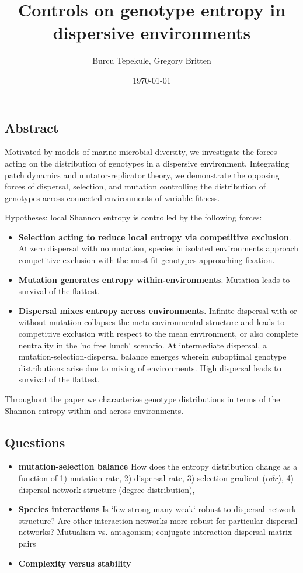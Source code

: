 \documentclass[12pt]{article}
\title{Controls on genotype entropy in dispersive environments}
\author{\small{Burcu Tepekule, Gregory Britten}}
\date{\small{\printdayoff\today}}
\begin{document}
\maketitle 

\subsection*{Abstract}
Motivated by models of marine microbial diversity, we investigate the forces acting on the distribution of genotypes in a dispersive environment. Integrating patch dynamics and mutator-replicator theory, we demonstrate the opposing forces of dispersal, selection, and mutation controlling the distribution of genotypes across connected environments of variable fitness. 

Hypotheses: local Shannon entropy is controlled by the following forces:
\begin{itemize}
\item \textbf{Selection acting to reduce local entropy via competitive exclusion}. At zero dispersal with no mutation, species in isolated environments approach competitive exclusion with the most fit genotypes approaching fixation.  
\item \textbf{Mutation generates entropy within-environments}. Mutation leads to survival of the flattest.
\item \textbf{Dispersal mixes entropy across environments}. Infinite dispersal with  or without mutation collapses the meta-environmental structure and leads to competitive exclusion with respect to the mean environment, or also complete neutrality in the 'no free lunch' scenario. At intermediate dispersal, a mutation-selection-dispersal balance emerges wherein suboptimal genotype distributions arise due to mixing of environments. High dispersal leads to survival of the flattest. 
\end{itemize}

Throughout the paper we characterize genotype distributions in terms of the Shannon entropy within and across environments.
\subsection*{Questions}

\begin{itemize}
\item \textbf{mutation-selection balance} How does the entropy distribution change as a function of 1) mutation rate, 2) dispersal rate, 3) selection gradient ($\alpha\delta r$), 4) dispersal network structure (degree distribution), 

\item \textbf{Species interactions} Is `few strong many weak` robust to dispersal network structure? Are other interaction networks more robust for particular dispersal networks? Mutualism vs. antagonism; conjugate interaction-dispersal matrix pairs
\item \textbf{Complexity versus stability}
\end{itemize}
\end{document}

